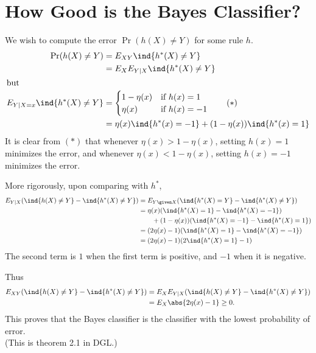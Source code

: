 \section{How Good is the Bayes Classifier?} \label{sec:bayest}
We wish to compute the error $\Pr(h(X) \ne Y)$ for some rule $h$.
\begin{align*}
    \Pr(h(X) \ne Y)
        &= E_{XY} \ind{h^*(X) \ne Y} \\
        &= E_X E_{Y \mid X} \ind{h^*(X) \ne Y} \\
    \intertext{but}
    E_{Y \mid X = x} \ind{h^*(X) \ne Y}
        &= \begin{cases}
            1 - \eta(x) & \text{if } h(x) = 1 \\
            \eta(x) & \text{if } h(x) = -1
        \end{cases} \tag{$*$} \\
        &= \eta(x) \ind{h^*(x) = -1} + (1 - \eta(x)) \ind{h^*(x) = 1}
\end{align*}
It is clear from $(*)$ that whenever $\eta(x) > 1 - \eta(x)$, setting
$h(x) = 1$ minimizes the error, and whenever $\eta(x) < 1 - \eta(x)$,
setting $h(x) = -1$ minimizes the error.

More rigorously, upon comparing with $h^*$,
\begin{align*}
    E_{Y \mid X} (\ind{h(X) \ne Y} - \ind{h^*(X) \ne Y})
        &= E_{Y \given X} (\ind{h^*(X) = Y} - \ind{h^*(X) \ne Y}) \\
        &= \eta(x) (\ind{h^*(X) = 1} - \ind{h^*(X) = -1}) \\
        &\qquad + (1 - \eta(x)) (\ind{h^*(X) = -1} - \ind{h^*(X) = 1}) \\
        &= (2 \eta(x) - 1)(\ind{h^*(X) = 1} - \ind{h^*(X) = -1}) \\
        &= (2 \eta(x) - 1)(2 \ind{h^*(X) = 1} - 1)
\end{align*}
The second term is $1$ when the first term is positive, and $-1$ when it is
negative.

Thus \begin{align*}
    E_{XY} (\ind{h(X) \ne Y} - \ind{h^*(X) \ne Y})
        &= E_X E_{Y \mid X} (\ind{h(X) \ne Y} - \ind{h^*(X) \ne Y}) \\
        &= E_X \abs{2 \eta(x) - 1} \ge 0.
\end{align*}
This proves that the Bayes classifier is the classifier with the lowest
probability of error. \\
(This is theorem 2.1 in DGL.)
